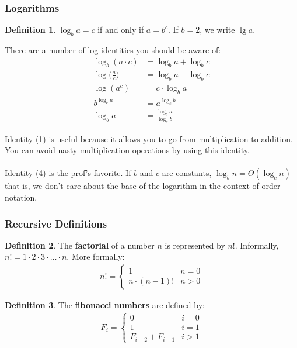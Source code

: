 \documentclass[]{article}
\theoremstyle{definition}
\newtheorem{defn}{Definition}[section]
\begin{document}
			\subsubsection{Logarithms}
				\begin{defn}
					$\log_b a = c$ if and only if $a = b^c$. If $b = 2$, we write $\lg a$. 
				\end{defn}

				There are a number of log identities you should be aware of:
				\begin{align}
					\log_b (a \cdot c) &= \log_b a + \log_b c \\
					\log \big( \frac{a}{c} \big) &= \log_b a - \log_b c \\
					\log(a^c) &= c \cdot \log_b a \\
					b^{\log_c a} &= a^{\log_c b} \\
					\log_b a &= \frac{\log_c a}{\log_c b} 
				\end{align}

				Identity (1) is useful because it allows you to go from multiplication to addition. You can avoid nasty multiplication operations by using this identity.
				\\ \\
				Identity (4) is the prof's favorite. If $b$ and $c$ are constants, $\log_b n = \Theta(\log_c n)$ \textendash{} that is, we don't care about the base of the logarithm in the context of order notation.
			\subsubsection{Recursive Definitions}
				\begin{defn}
					The \textbf{factorial} of a number $n$ is represented by $n!$. Informally, $n! = 1 \cdot 2 \cdot 3 \cdot \ldots \cdot n$. More formally:
					\begin{align*}
						n! = \begin{cases}
							1 & n = 0 \\
							n \cdot (n - 1)! & n > 0
						\end{cases}
					\end{align*}
				\end{defn}

				\begin{defn}
					The \textbf{fibonacci numbers} are defined by:
					\begin{align*}
						F_i = \begin{cases}
							0 & i = 0 \\
							1 & i = 1 \\
							F_{i - 2} + F_{i - 1} & i > 1
						\end{cases}
					\end{align*}
				\end{defn}
\end{document}
